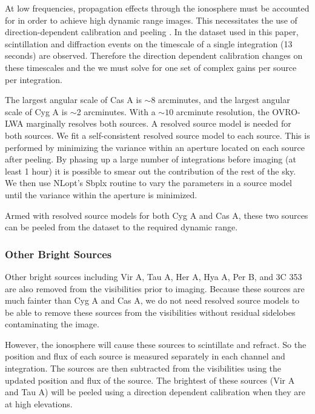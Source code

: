 \documentclass[twocolumn]{aastex61}
\newcommand{\todo}[1]{\textcolor{red}{TODO: #1}\PackageWarning{TODO:}{#1!}}
\begin{document}
At low frequencies, propagation effects through the ionosphere must be accounted for in order to
achieve high dynamic range images. This necessitates the use of direction-dependent calibration and
peeling \citep{2008ISTSP...2..707M, 2015MNRAS.449.2668S}.  In the dataset used in this paper,
scintillation and diffraction events on the timescale of a single integration (13 seconds) are
observed. Therefore the direction dependent calibration changes on these timescales and the we must
solve for one set of complex gains per source per integration.

The largest angular scale of Cas A is $\sim$8 arcminutes, and the largest angular scale of Cyg A is
$\sim$2 arcminutes. With a $\sim10$ arcminute resolution, the OVRO-LWA marginally resolves both
sources. A resolved source model is needed for both sources. We fit a self-consistent resolved
source model to each source. This is performed by minimizing the variance within an aperture located
on each source after peeling. By phasing up a large number of integrations before imaging (at least
1 hour) it is possible to smear out the contribution of the rest of the sky.  We then use NLopt's
Sbplx routine \citep{nlopt, sbplx} to vary the parameters in a source model until the variance
within the aperture is minimized.

Armed with resolved source models for both Cyg A and Cas A, these two sources can be peeled from the
dataset to the required dynamic range.


\subsubsection{Other Bright Sources}

Other bright sources including Vir A, Tau A, Her A, Hya A, Per B, and 3C 353 are also removed from
the visibilities prior to imaging. Because these sources are much fainter than Cyg A and Cas A, we
do not need resolved source models to be able to remove these sources from the visibilities without
residual sidelobes contaminating the image.

However, the ionosphere will cause these sources to scintillate and refract. So the position and
flux of each source is measured separately in each channel and integration. The sources are then
subtracted from the visibilities using the updated position and flux of the source. The brightest of
these sources (Vir A and Tau A) will be peeled using a direction dependent calibration when they are
at high elevations.
\end{document}

